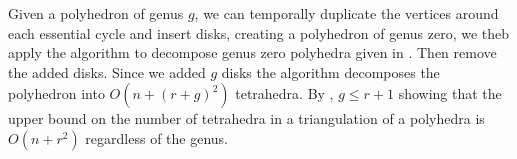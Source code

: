 Given a polyhedron of genus $g$, we can temporally 
duplicate the vertices around each essential cycle and insert disks,
 creating a polyhedron of genus zero, we theb apply the algorithm to
decompose genus zero polyhedra given in \cite{triangulating-polytope-1990}.
Then remove the added disks.
Since we added $g$ disks the algorithm decomposes
the polyhedron into $O(n+ (r+g)^2)$ tetrahedra.
By , $g\leq r+1$ showing that the upper bound
on the number of tetrahedra in a triangulation
of a polyhedra is $O(n+r^2)$ regardless of the genus.

